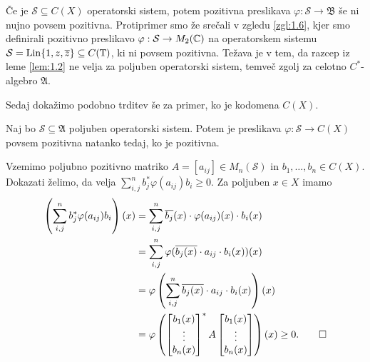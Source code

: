 \begin{opomba}
    Če je $\mathcal{S} \subseteq C(X)$ operatorski sistem, potem pozitivna preslikava $\varphi: \mathcal{S} \to \mathfrak{B}$
    še ni nujno povsem pozitivna.
    Protiprimer smo že srečali v zgledu \ref{zgl:1.6}, kjer smo definirali 
    pozitivno preslikavo $\varphi: \mathcal{S} \to M_2 (\mathbb C)$ na operatorskem sistemu $\mathcal{S} = \operatorname{Lin}\{1, z, \overline{z}\} \subseteq C(\mathbb T)$,
    ki ni povsem pozitivna.
    Težava je v tem, da razcep iz leme \ref{lem:1.2} ne velja za poljuben operatorski sistem, temveč zgolj za celotno $C^*$-algebro $\mathfrak{A}$.
\end{opomba}

Sedaj dokažimo podobno trditev še za primer, ko je kodomena $C(X)$.

\begin{trditev}
    Naj bo $\mathcal{S} \subseteq \mathfrak{A}$ poljuben operatorski sistem.
    Potem je preslikava $\varphi: \mathcal{S} \to C(X)$ povsem pozitivna natanko tedaj, ko je pozitivna.
\end{trditev}


\begin{dokaz}
        Vzemimo poljubno pozitivno matriko $A = [a_{ij}] \in M_n(\mathcal{S})$ in $b_1, \dots, b_n \in C(X)$. Dokazati želimo, da velja
        $\sum_{i, j} ^n b_j^* \varphi(a_{ij}) b_i \geq 0$. Za poljuben $x \in X$ imamo
        \begin{align*}
            \left(\sum_{i, j} ^n b_j^* \varphi(a_{ij}) b_i \right) (x) &= \sum_{i, j} ^n \overline{b_j} (x) \cdot \varphi(a_{ij}) (x) \cdot b_i (x)\\
            &= \sum_{i, j} ^n  \varphi(\overline{b_j (x)} \cdot a_{ij} \cdot b_i (x)) (x) \\
            &=  \varphi \left(\sum_{i, j} ^n \overline{b_j (x)} \cdot a_{ij} \cdot b_i (x) \right) (x) \\
            &= \varphi \left( \begin{bmatrix}
                b_1 (x) \\ \vdots \\ b_n (x)
            \end{bmatrix}^* A \begin{bmatrix}
                b_1 (x) \\ \vdots \\ b_n (x)
            \end{bmatrix} \right) (x) \geq 0. \qedhere
        \end{align*}
\end{dokaz}

